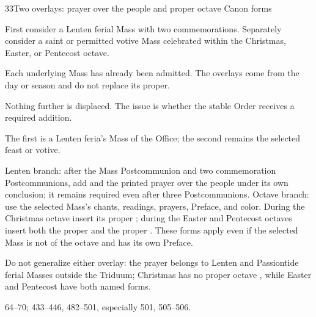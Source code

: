 \begin{casefile}{33}{Two overlays: prayer over the people and proper octave Canon forms}
\item[Calendar facts] First consider a Lenten ferial Mass with two commemorations.  Separately consider a saint or permitted votive Mass celebrated within the Christmas, Easter, or Pentecost octave.
\item[Ranks and rows] Each underlying Mass has already been admitted.  The overlays come from the day or season and do not replace its proper.
\item[Impeded item] Nothing further is displaced.  The issue is whether the stable Order receives a required addition.
\item[Mass category] The first is a Lenten feria's Mass of the Office; the second remains the selected feast or votive.
\item[Assembly] Lenten branch: after the Mass Postcommunion and two commemoration Postcommunions, add  and the printed prayer over the people under its own conclusion; it remains required even after three Postcommunions.  Octave branch: use the selected Mass's chants, readings, prayers, Preface, and color.  During the Christmas octave insert its proper ; during the Easter and Pentecost octaves insert both the proper  and the proper .  These forms apply even if the selected Mass is not of the octave and has its own Preface.
\item[Boundary] Do not generalize either overlay: the prayer belongs to Lenten and Passiontide ferial Masses outside the Triduum; Christmas has no proper octave , while Easter and Pentecost have both named forms.
\item[Rubric locus] 64--70; 433--446, 482--501, especially 501, 505--506.
\end{casefile}

